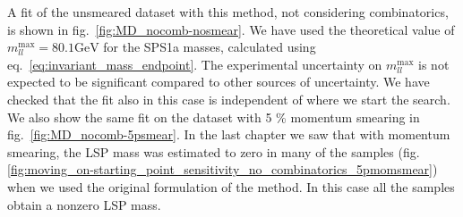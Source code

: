 \documentclass[twoside,english]{uiofysmaster}
\begin{document}
A fit of the unsmeared dataset with this method, not considering combinatorics, is shown in fig.\ \ref{fig:MD_nocomb-nosmear}. We have used the theoretical value of $m_{ll}^\mathrm{max} = 80.1 \mathrm{GeV}$ for the SPS1a masses, calculated using eq.\ \eqref{eq:invariant_mass_endpoint}. The experimental uncertainty on $m_{ll}^\mathrm{max}$ is not expected to be significant compared to other sources of uncertainty. We have checked that the fit also in this case is independent of where we start the search. We also show the same fit on the dataset with 5 \% momentum smearing in fig.\ \ref{fig:MD_nocomb-5psmear}. In the last chapter we saw that with momentum smearing, the LSP mass was estimated to zero in many  of the samples (fig. \ref{fig:moving_on-starting_point_sensitivity_no_combinatorics_5pmomsmear}) when we used the original formulation of the method. In this case all the samples obtain a nonzero LSP mass.
\end{document}

